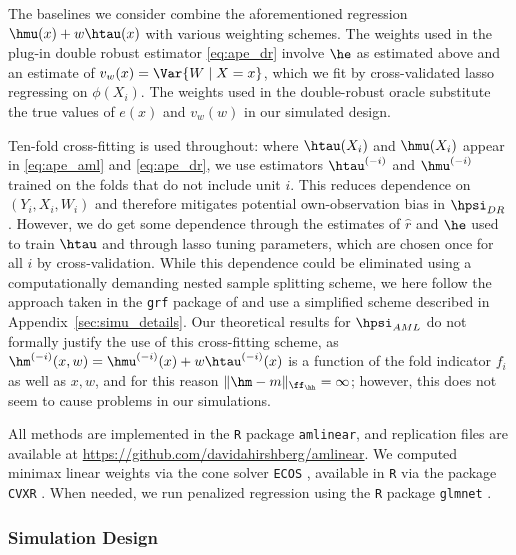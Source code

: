 \documentclass[aos,submission]{imsart}
\theoremstyle{plain}
\theoremstyle{remark}
\DeclarePairedDelimiter\norm{\lVert}{\rVert}
\begin{document}
The baselines we consider combine the aforementioned 
regression $\hmu(x) + w\htau(x)$ with various weighting schemes. 
The weights used in the plug-in double robust estimator \eqref{eq:ape_dr} 
involve $\he$ as estimated above and an estimate of $v_w(x)=\Var{W \mid X=x}$,
which we fit by cross-validated lasso regressing  on $\phi(X_i)$. 
The weights used in the double-robust oracle substitute the true values of $e(x)$ and $v_w(w)$ in our simulated design.



Ten-fold cross-fitting is used throughout: where $\htau(X_i)$ and $\hmu(X_i)$ appear in
\eqref{eq:ape_aml} and \eqref{eq:ape_dr}, we use estimators $\htau^{(-i)}$ and $\hmu^{(-i)}$
trained on the folds that do not include unit $i$. This 
reduces dependence on $(Y_i,X_i,W_i)$ and therefore mitigates potential own-observation bias 
in $\hpsi_{DR}$ \citep[see e.g.,][]{chernozhukov2016double}. However, we do get some dependence
through the estimates of $\hat r$ and $\he$ used to train $\htau$ and
through lasso tuning parameters, which are chosen once for all $i$ by cross-validation.
While this dependence could be eliminated using a computationally demanding nested sample splitting scheme,
we here follow the approach taken in the \texttt{grf} package of \citet*{athey2016generalized} and use a simplified scheme
described in Appendix~\ref{sec:simu_details}.
 Our theoretical results for $\hpsi_{AML}$ do not formally justify the use of this cross-fitting scheme,
as $\hm^{(-i)}(x,w) = \hmu^{(-i)}(x) + w\htau^{(-i)}(x)$ is a function of the fold indicator $f_i$ as
well as $x,w$, and for this reason $\norm{\hm - m}_{\ff_{\hh}} = \infty$;
however, this does not seem to cause problems in our simulations.


All methods are implemented in the \texttt{R} package \texttt{amlinear}, and replication files are
available at \url{https://github.com/davidahirshberg/amlinear}.
We computed minimax linear weights via the cone solver \texttt{ECOS} \citep*{domahidi2013ecos},
available in \texttt{R} via the package \texttt{CVXR} \citep{CVXR}.
When needed, we run penalized regression using the \texttt{R} package
\texttt{glmnet} \citep*{friedman2010regularization}.


\subsubsection{Simulation Design}
\label{sec:spec}
\end{document}
